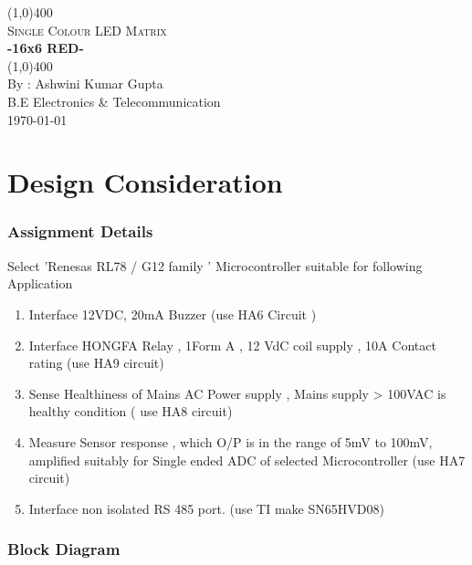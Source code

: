 \documentclass[15pt]{article}
\begin{document}
	
	\begin{titlepage}
		\begin{center}
			\vspace*{1cm}
			\vfill
			\line(1,0){400}\\[1mm]
			\Huge{\textsc{Single Colour LED Matrix}}\\ [3mm]
			\huge{\textbf{-16x6 RED-}}\\ [1mm]
			\line(1,0){400}\\
			\vfill 
			\large{By : Ashwini Kumar Gupta\\
			B.E  Electronics \& Telecommunication\\}
			\today\\
			
		\end{center}
	\end{titlepage}
	
	\tableofcontents
	\thispagestyle{empty}
	\clearpage
	
	\setcounter{page}{1}
	
	\part{Design Consideration}
		
		
	\section{Assignment Details}
	Select 'Renesas RL78 / G12 family ' Microcontroller suitable for following Application	
		\begin{enumerate}
			\item Interface 12VDC, 20mA Buzzer (use HA6 Circuit )
			\item Interface HONGFA Relay , 1Form A , 12 VdC coil supply , 10A Contact rating (use HA9 circuit)
			\item Sense Healthiness of Mains AC Power supply , Mains supply > 100VAC is healthy condition ( use HA8 circuit)
			\item Measure Sensor response , which O/P is in the range of 5mV to 100mV, amplified suitably for Single ended ADC of selected Microcontroller (use HA7 circuit)
			\item  Interface non isolated RS 485 port. (use TI make SN65HVD08)
		\end{enumerate}
		
		
	\section{Block Diagram}
		
\end{document}
